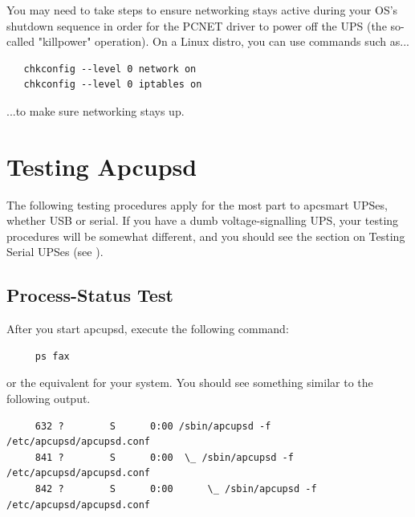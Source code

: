 You may need to take steps to ensure networking stays active during your
OS's shutdown sequence in order for the PCNET driver to power off the 
UPS (the so-called "killpower" operation). On a Linux distro, you can use
commands such as...

\begin{verbatim}
   chkconfig --level 0 network on
   chkconfig --level 0 iptables on
\end{verbatim}

...to make sure networking stays up.

    
\label{Testing-Apcupsd}

\section*{Testing Apcupsd}

\label{index-Testing-84}
The following testing procedures apply for the most part to apcsmart UPSes,
whether USB or serial.  If you have a dumb voltage-signalling UPS, your
testing procedures will be somewhat different, and you should see the section
on Testing Serial UPSes (see 
). 

\label{Process_002dStatus-Test}

\subsection*{Process-Status Test}

\label{index-Process-Status-Testing-85}
\label{index-Testing_002c-Process-Status-86}
After you start apcupsd, execute the following command: 

\footnotesize
\begin{verbatim}
     ps fax
\end{verbatim}
\normalsize

or the equivalent for your system. You should see something similar to
the following output. 

\footnotesize
\begin{verbatim}
     632 ?        S      0:00 /sbin/apcupsd -f /etc/apcupsd/apcupsd.conf
     841 ?        S      0:00  \_ /sbin/apcupsd -f /etc/apcupsd/apcupsd.conf
     842 ?        S      0:00      \_ /sbin/apcupsd -f /etc/apcupsd/apcupsd.conf
\end{verbatim}
\normalsize

